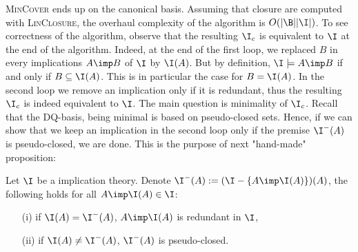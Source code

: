 \textsc{MinCover} ends up on the canonical basis. Assuming that 
closure are computed with \textsc{LinClosure}, the overhaul complexity of
the algorithm is $O(|\B||\I|)$. To see correctness of the algorithm, observe
that the resulting $\I_c$ is equivalent to $\I$ at the end of the algorithm.
Indeed, at the end of the first loop, we replaced $B$ in every implications $A 
\imp B$ of $\I$ by $\I(A)$. But by definition, $\I \models A \imp B$ if and 
only if $B \subseteq \I(A)$. This is in particular the case for $B = \I(A)$.
In the second loop we remove an implication only if it is redundant, thus
the resulting $\I_c$ is indeed equivalent to $\I$. The main question is 
minimality of $\I_c$. Recall that the DQ-basis, being minimal is based on 
pseudo-closed sets. Hence, if we can show that we keep an implication in the 
second loop only if the premise $\I^{-}(A)$ is pseudo-closed, we are done. This
is the purpose of next "hand-made" proposition:

\begin{proposition} Let $\I$ be a  implication theory. 
	Denote $\I^{-}(A) := (\I - \{ A \imp \I(A) \})(A)$, the following holds for 
	all 
	$A \imp 
	\I(A) \in \I$:
	\begin{itemize}
		\item[(i)] if $\I(A) = \I^{-}(A)$, $A \imp \I(A)$ is redundant in $\I$,
		\item[(ii)] if $\I(A) \neq \I^{-}(A)$, $\I^{-}(A)$ is pseudo-closed.
	\end{itemize}
	
\end{proposition}

